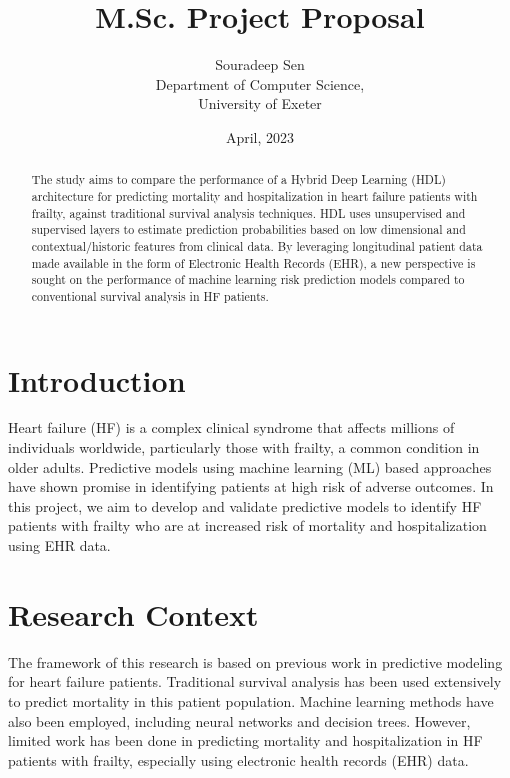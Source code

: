 \documentclass[%
 reprint,
 amsmath,amssymb,
 aps,
 nofootinbib
]{revtex4-2}
\theoremstyle{definition}
\begin{document}

\title{M.Sc. Project Proposal}%
\author{Souradeep Sen \\
	 \small Department of Computer Science, \\ 
	 \small University of Exeter
	}

\date{April, 2023}%

\begin{abstract}
The study aims to compare the performance of a Hybrid Deep Learning (HDL) architecture for predicting mortality and hospitalization in heart failure patients with frailty, against traditional survival analysis techniques. HDL uses unsupervised and supervised layers to estimate prediction probabilities based on low dimensional and contextual/historic features from clinical data. By leveraging longitudinal patient data made available in the form of Electronic Health Records (EHR), a new perspective is sought on the performance of machine learning risk prediction models compared to conventional survival analysis in HF patients.
\end{abstract}


\maketitle

\section{\label{intro}Introduction}
Heart failure (HF) is a complex clinical syndrome that affects millions of individuals worldwide, particularly those with frailty, a common condition in older adults. Predictive models using machine learning (ML) based approaches have shown promise in identifying patients at high risk of adverse outcomes. In this project, we aim to develop and validate predictive models to identify HF patients with frailty who are at increased risk of mortality and hospitalization using EHR data. 

\section{\label{rescon}Research Context}
The framework of this research is based on previous work in predictive modeling for heart failure patients. Traditional survival analysis has been used extensively to predict mortality in this patient population. Machine learning methods have also been employed, including neural networks and decision trees. However, limited work has been done in predicting mortality and hospitalization in HF patients with frailty, especially using electronic health records (EHR) data.
\end{document}
